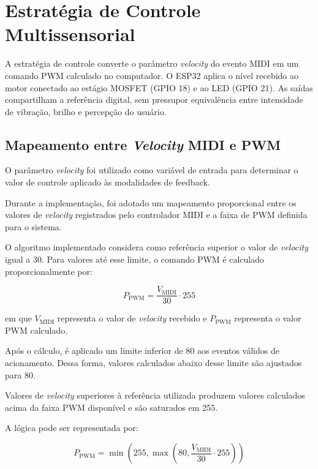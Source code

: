 \section{Estratégia de Controle Multissensorial}
\label{sec:estrategia_controle}

A estratégia de controle converte o parâmetro \textit{velocity} do evento MIDI em um comando PWM calculado no computador. O ESP32 aplica o nível recebido ao motor conectado ao estágio MOSFET (GPIO 18) e ao LED (GPIO 21). As saídas compartilham a referência digital, sem pressupor equivalência entre intensidade de vibração, brilho e percepção do usuário.

\subsection{Mapeamento entre \textit{Velocity} MIDI e PWM}
\label{sec:mapeamento_velocity_pwm}

O parâmetro \textit{velocity} foi utilizado como variável de entrada para determinar o valor de controle aplicado às modalidades de feedback.

Durante a implementação, foi adotado um mapeamento proporcional entre os valores de \textit{velocity} registrados pelo controlador MIDI e a faixa de PWM definida para o sistema.

O algoritmo implementado considera como referência superior o valor de \textit{velocity} igual a 30. Para valores até esse limite, o comando PWM é calculado proporcionalmente por:

\begin{equation}
P_{\mathrm{PWM}} =
\frac{V_{\mathrm{MIDI}}}{30}
\cdot 255
\end{equation}

em que $V_{\mathrm{MIDI}}$ representa o valor de \textit{velocity} recebido e $P_{\mathrm{PWM}}$ representa o valor PWM calculado.

Após o cálculo, é aplicado um limite inferior de 80 aos eventos válidos de acionamento. Dessa forma, valores calculados abaixo desse limite são ajustados para 80.

Valores de \textit{velocity} superiores à referência utilizada produzem valores calculados acima da faixa PWM disponível e são saturados em 255.

A lógica pode ser representada por:

\begin{equation}
P_{\mathrm{PWM}} =
\min
\left(
255,
\max
\left(
80,
\frac{V_{\mathrm{MIDI}}}{30}\cdot255
\right)
\right)
\end{equation}

